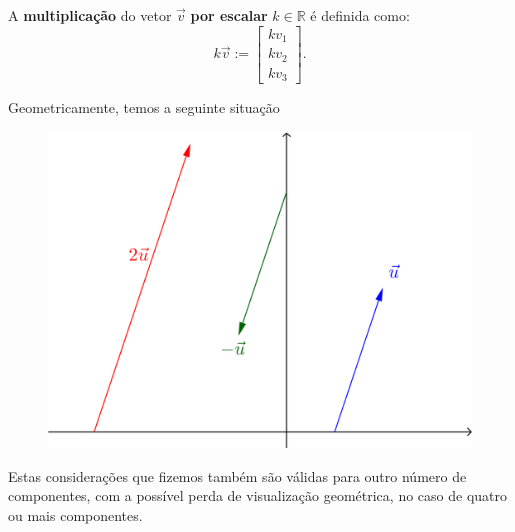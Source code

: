 A \textbf{multiplicação} do vetor $\vec{v}$ \textbf{por escalar} $k \in \mathbb{R}$ é definida como:
\begin{equation}
k \vec{v} :=
\left[
  \begin{array}{c}
    k v_1 \\
    k v_2 \\
    k v_3
  \end{array}
\right].
\end{equation} 


Geometricamente, temos a seguinte situação
\begin{figure}[h!]
\begin{center}
\includegraphics[width=0.3\linewidth]{Semana02/semana02-escalar}
\end{center}
\end{figure}



Estas considerações que fizemos também são válidas para outro número de componentes, com a possível perda de visualização geométrica, no caso de quatro ou mais componentes.

